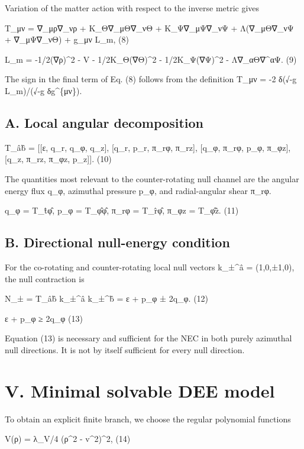 Variation of the matter action with respect to the inverse metric gives

T\_μν = ∇\_μρ∇\_νρ + K\_Θ∇\_μΘ∇\_νΘ + K\_Ψ∇\_μΨ∇\_νΨ + Λ(∇\_μΘ∇\_νΨ +
∇\_μΨ∇\_νΘ) + g\_μν L\_m, (8)

L\_m = -1/2(∇ρ)\^{}2 - V - 1/2K\_Θ(∇Θ)\^{}2 - 1/2K\_Ψ(∇Ψ)\^{}2 -
Λ∇\_αΘ∇\^{}αΨ. (9)

The sign in the final term of Eq. (8) follows from the definition T\_μν
= -2 δ(√-g L\_m)/(√-g δg\^{}\{μν\}).

\subsection{A. Local angular
decomposition}\label{a.-local-angular-decomposition}

T\_âb̂ = {[}{[}ε, q\_r, q\_φ, q\_z{]}, {[}q\_r, p\_r, π\_rφ, π\_rz{]},
{[}q\_φ, π\_rφ, p\_φ, π\_φz{]}, {[}q\_z, π\_rz, π\_φz, p\_z{]}{]}. (10)

The quantities most relevant to the counter-rotating null channel are
the angular energy flux q\_φ, azimuthal pressure p\_φ, and
radial-angular shear π\_rφ.

q\_φ = T\_t̂φ̂, p\_φ = T\_φ̂φ̂, π\_rφ = T\_r̂φ̂, π\_φz = T\_φ̂ẑ. (11)

\subsection{B. Directional null-energy
condition}\label{b.-directional-null-energy-condition}

For the co-rotating and counter-rotating local null vectors k\_±\^{}â =
(1,0,±1,0), the null contraction is

N\_± = T\_âb̂ k\_±\^{}â k\_±\^{}b̂ = ε + p\_φ ± 2q\_φ. (12)

ε + p\_φ ≥ 2\textbar q\_φ\textbar{} (13)

Equation (13) is necessary and sufficient for the NEC in both purely
azimuthal null directions. It is not by itself sufficient for every null
direction.

\section{V. Minimal solvable DEE
model}\label{v.-minimal-solvable-dee-model}

To obtain an explicit finite branch, we choose the regular polynomial
functions

V(ρ) = λ\_V/4 (ρ\^{}2 - v\^{}2)\^{}2, (14)

